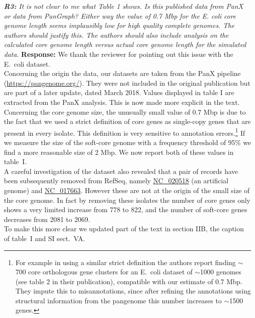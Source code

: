 \documentclass[aps,rmp,onecolumn]{revtex4-1}
\newcommand{\reviewer}[2]{{\it \textbf{#1:} #2\vskip 5mm}}
\newcommand{\response}[1]{{{\color{response}\textbf{Response:} #1}}\vskip 5mm}
\newcommand{\SIdataBenchmark}{V}
\begin{document}
\reviewer{R3}{It is not clear to me what Table 1 shows. Is this published data from PanX or data from PanGraph? Either way the value of 0.7 Mbp for the E. coli core genome length seems implausibly low for high quality complete genomes. The authors should justify this. The authors should also include analysis on the calculated core genome length versus actual core genome length for the simulated data.}
\response{
We thank the reviewer for pointing out this issue with the E.~coli dataset.\\

Concerning the origin the data, our datasets are taken from the PanX pipeline (\url{https://pangenome.org/}). They were not included in the original publication but are part of a later update, dated March 2018. Values displayed in table I are extracted from the PanX analysis. This is now made more explicit in the text.\\

Concerning the core genome size, the unusually small value of 0.7 Mbp is due to the fact that we used a strict definition of core genes as single-copy genes that are present in every isolate. This definition is very sensitive to annotation errors.\footnote{
      For example in \cite{sutton2021pan} using a similar strict definition the authors report finding $\sim$700 core orthologous gene clusters for an E.~coli dataset of $\sim$1000 genomes (see table 2 in their publication), compatible with our estimate of 0.7 Mbp. They impute this to misannotations, since after refining the annotations using structural information from the pangenome this number increases to $\sim$1500 genes.
} If we measure the size of the soft-core genome with a frequency threshold of 95\% we find a more reasonable size of 2 Mbp. We now report both of these values in table~I.\\
A careful investigation of the dataset also revealed that a pair of records have been subsequently removed from RefSeq, namely \href{https://www.ncbi.nlm.nih.gov/nuccore/NC_020518.1?report=genbank}{NC\_020518} (an artificial genome) and  \href{https://www.ncbi.nlm.nih.gov/nuccore/NC_017663.1?report=genbank}{NC\_017663}. However these are not at the origin of the small size of the core genome. In fact by removing these isolates the number of core genes only shows a very limited increase from 778 to 822, and the number of soft-core genes decreases from 2081 to 2069.\\ 

To make this more clear we updated part of the text in section IIB, the caption of table~I and SI sect.~{\SIdataBenchmark}A.
}
\end{document}
